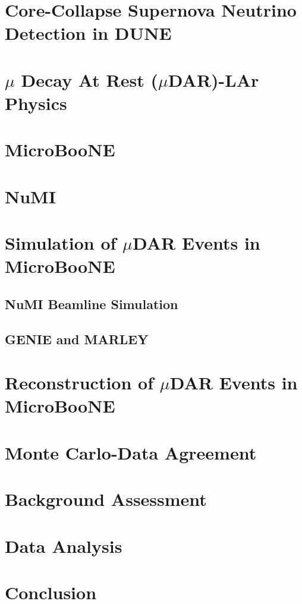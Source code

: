 \section{Core-Collapse Supernova Neutrino Detection in DUNE}
\section{$\mu$ Decay At Rest ($\mu$DAR)-LAr Physics}
\section{MicroBooNE}
\section{NuMI}
\section{Simulation of $\mu$DAR Events in MicroBooNE}
\subsection{NuMI Beamline Simulation}
\subsection{GENIE and MARLEY}
\section{Reconstruction of $\mu$DAR Events in MicroBooNE}
\section{Monte Carlo-Data Agreement}
\section{Background Assessment}
\section{Data Analysis}
\section{Conclusion}